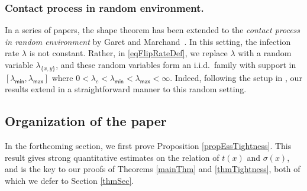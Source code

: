 \subsubsection{Contact process in random environment.}
In a series of papers, the shape theorem has been extended to the \emph{contact process in random environment} by Garet and Marchand~\cite{GaretMarch12, GaretMarch14}. In this setting, the infection rate $\lambda$ is not constant. Rather, in \eqref{eqFlipRateDef}, we replace $\lambda$ with a random variable $\lambda_{\{x,y\}}$, and these random variables form an i.i.d.\ family with support in $[\lambda_{\mathsf{min}},\lambda_{\mathsf{max}}]$ where $0<\lambda_c<\lambda_{\mathsf{min}}<\lambda_{\mathsf{max}}<\infty$. Indeed, following the setup in \cite{GaretMarch12}, our results extend in a straightforward manner to this random setting. 

\iffalse \subsubsection{Density of record times.} Theorem~\ref{mainThm} implies that the expected hitting times $\{h_x(k)\}_{k \ge 0} =  \{\oE[t(kx)]\}_{k \ge 0}$ exhibit infinitely many \emph{points of increase}, i.e. points where $\oE[h_x(k - 1)] \le \oE[h_x(k)]$. In fact, the density of points of increase becomes arbitrarily close to 1 as $x$ grows large. As we will see in the Section~\ref{thmSec}, Theorem~\ref{mainThm} can be strengthened in the sense that points of increase can be replaced by \emph{record points}. That is, integers $k \ge 0$ such that $\oE[h_x(k)] \ge \oE[h_x(\ell)]$ for all $\ell \le k$. \fi
\bigskip


\subsection{Organization of the paper}
In the forthcoming section, we first prove Proposition \ref{propEssTightness}. This result gives strong quantitative estimates on the relation of $t(x)$ and $\sigma(x)$, and is the key to our proofs of Theorems \ref{mainThm} and \ref{thmTightness}, both of which we defer to Section \ref{thmSec}. 
